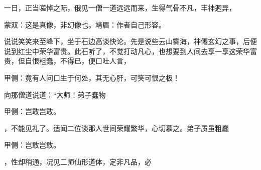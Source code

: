 \begin{parag}
    一日，正当嗟悼之际，俄见一僧一道远远而来，生得气骨不凡，丰神迥异，\begin{note}蒙双：这是真像，非幻像也。靖眉：作者自己形容。\end{note}说说笑笑来至峰下，坐于石边高谈快论。先是说些云山雾海，神僊玄幻之事，后便说到红尘中荣华富贵。此石听了，不觉打动凡心，也想要到人间去享一享这荣华富贵，但自恨粗蠢，不得已，便口吐人言，\begin{note}甲侧：竟有人问口生于何处，其无心肝，可笑可恨之极！\end{note}向那僧道说道：“大师！弟子蠢物\begin{note}甲侧：岂敢岂敢。\end{note}，不能见礼了。适闻二位谈那人世间荣耀繁华，心切慕之。弟子质虽粗蠢\begin{note}甲侧：岂敢岂敢。\end{note}，性却稍通，况见二师仙形道体，定非凡品，必
\end{parag}
